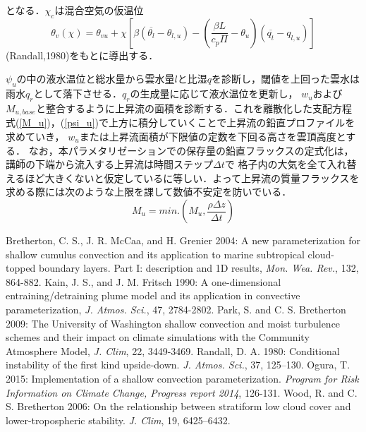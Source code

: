 \documentclass[platex, dvipdfmx]{jsarticle}
\begin{document}
となる．$\chi_c$は混合空気の仮温位
\begin{equation}
    \theta_v(\chi)=\theta_{vu}+\chi\left[ \beta(\overline{\theta_l}-\theta_{l,u})-\left(\frac{\beta L}{c_p\Pi}-\theta_u\right)(\overline{q_t}-q_{l,u})\right]   
\end{equation}
(Randall,1980)をもとに導出する．

$\psi_u$の中の液水温位と総水量から雲水量$l$と比湿$q$を診断し，閾値を上回った雲水は雨水$q_r$として落下させる．$q_r$の生成量に応じて液水温位を更新し，
$w_u$および$M_{u,base}$と整合するように上昇流の面積を診断する．これを離散化した支配方程式(\ref{M_u})，(\ref{psi_u})で上方に積分していくことで上昇流の鉛直プロファイルを求めていき，
$w_u$または上昇流面積が下限値の定数を下回る高さを雲頂高度とする．
なお，本パラメタリゼーションでの保存量の鉛直フラックスの定式化は，講師の下端から流入する上昇流は時間ステップ$\Delta t$で
格子内の大気を全て入れ替えるほど大きくないと仮定しているに等しい．よって上昇流の質量フラックスを求める際には次のような上限を課して数値不安定を防いでいる．
\begin{equation}
    M_u = min.\left(M_u, \frac{\rho\Delta z}{\Delta t}\right)    
\end{equation}

\begin{thebibliography}{99}
     Bretherton, C. S., J. R. McCaa, and H. Grenier 2004: 
        A new parameterization for shallow cumulus convection and its application to marine subtropical cloud-topped boundary layers. 
        Part I: description and 1D results, \textit{Mon. Wea. Rev.}, 132, 864-882.
    Kain, J. S., and J. M. Fritsch 1990: 
        A one-dimensional entraining/detraining plume model and its application in convective parameterization,
        \textit{J. Atmos. Sci.}, 47, 2784-2802.
     Park, S. and C. S. Bretherton 2009: 
        The University of Washington shallow convection and moist turbulence schemes and their impact on 
        climate simulations with the Community Atmosphere Model, \textit{J. Clim}, 22, 3449-3469.
     Randall, D. A. 1980: 
        Conditional instability of the first kind upside-down. \textit{J. Atmos. Sci.}, 37, 125–130.
     Ogura, T. 2015: 
        Implementation of a shallow convection parameterization. \textit{Program for Risk Information on Climate Change, 
        Progress report 2014}, 126-131.
     Wood, R. and C. S. Bretherton 2006: 
        On the relationship between stratiform low cloud cover and lower-tropospheric stability. 
        \textit{J. Clim}, 19, 6425–6432.
\end{thebibliography}
\end{document}
